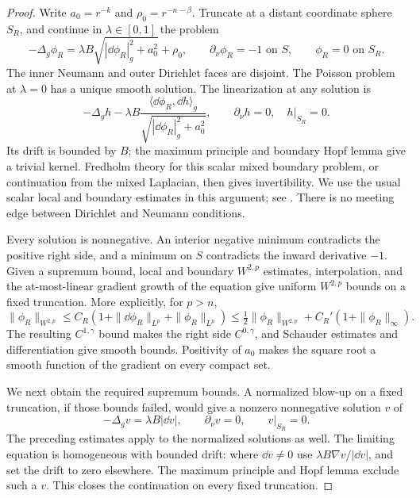 \begin{proof}
Write $a_0=r^{-k}$ and $\rho_0=r^{-n-\beta}$.  Truncate at a distant
coordinate sphere $S_R$, and continue in $\lambda\in[0,1]$ the problem
\[
 -\Delta_g\phi_R
 =\lambda B\sqrt{|\dd\phi_R|_g^2+a_0^2}+\rho_0,
 \qquad \partial_\nu\phi_R=-1\text{ on }S,
 \qquad \phi_R=0\text{ on }S_R.
\]
The inner Neumann and outer Dirichlet faces are disjoint.  The Poisson
problem at $\lambda=0$ has a unique smooth solution.  The linearization
at any solution is
\[
 -\Delta_g h-\lambda B
 \frac{\langle\dd\phi_R,\dd h\rangle_g}
      {\sqrt{|\dd\phi_R|_g^2+a_0^2}},
 \qquad \partial_\nu h=0,\quad h|_{S_R}=0.
\]
Its drift is bounded by $B$; the maximum principle and boundary Hopf
lemma give a trivial kernel.  Fredholm theory for this scalar mixed
boundary problem, or continuation from the mixed Laplacian, then gives
invertibility.  We use the usual scalar local and boundary estimates
in this argument; see \cite{GilbargTrudinger2001}.  There is no meeting
edge between Dirichlet and Neumann conditions.

Every solution is nonnegative.  An interior negative minimum contradicts
the positive right side, and a minimum on $S$ contradicts the inward
derivative $-1$.  Given a supremum bound, local and boundary
$W^{2,p}$ estimates, interpolation, and the at-most-linear gradient
growth of the equation give uniform $W^{2,p}$ bounds on a fixed
truncation.  More explicitly, for $p>n$,
\[
 \|\phi_R\|_{W^{2,p}}
 \leq C_R(1+\|\dd\phi_R\|_{L^p}+\|\phi_R\|_{L^p})
 \leq\tfrac12\|\phi_R\|_{W^{2,p}}
       +C_R'(1+\|\phi_R\|_\infty).
\]
The resulting $C^{1,\gamma}$ bound makes the right side
$C^{0,\gamma}$, and Schauder estimates and differentiation give
smooth bounds.  Positivity of $a_0$ makes the square root a smooth
function of the gradient on every compact set.

We next obtain the required supremum bounds.  A normalized blow-up on
a fixed truncation, if those bounds failed, would give a nonzero
nonnegative solution $v$ of
\[
 -\Delta_g v=\lambda B|\dd v|,
 \qquad \partial_\nu v=0,
 \qquad v|_{S_R}=0.
\]
The preceding estimates apply to the normalized solutions as well.
The limiting equation is homogeneous with bounded drift: where
$\dd v\ne0$ use $\lambda B\nabla v/|\dd v|$, and set the drift to
zero elsewhere.  The maximum principle and Hopf lemma exclude such a
$v$.  This closes the continuation on every fixed truncation.


\end{proof}
